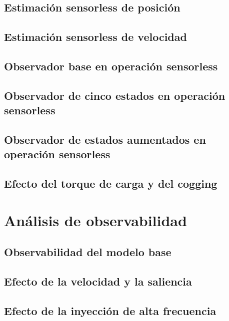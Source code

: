 \subsection{Estimación sensorless de posición}

\subsection{Estimación sensorless de velocidad}

\subsection{Observador base en operación sensorless}

\subsection{Observador de cinco estados en operación sensorless}

\subsection{Observador de estados aumentados en operación sensorless}

\subsection{Efecto del torque de carga y del cogging}


\section{Análisis de observabilidad}

\subsection{Observabilidad del modelo base}

\subsection{Efecto de la velocidad y la saliencia}

\subsection{Efecto de la inyección de alta frecuencia}

